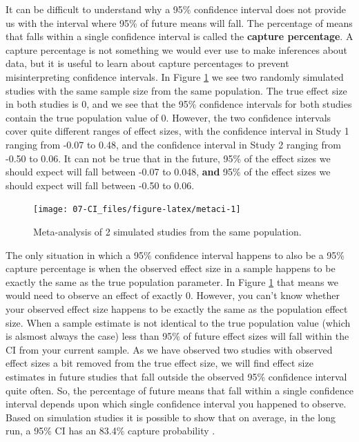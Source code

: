 \documentclass[
  oneside]{book}
\begin{document}
It can be difficult to understand why a 95\% confidence interval does not provide us with the interval where 95\% of future means will fall. The percentage of means that falls within a single confidence interval is called the \textbf{capture percentage}. A capture percentage is not something we would ever use to make inferences about data, but it is useful to learn about capture percentages to prevent misinterpreting confidence intervals. In Figure \ref{fig:metaci} we see two randomly simulated studies with the same sample size from the same population. The true effect size in both studies is 0, and we see that the 95\% confidence intervals for both studies contain the true population value of 0. However, the two confidence intervals cover quite different ranges of effect sizes, with the confidence interval in Study 1 ranging from -0.07 to 0.48, and the confidence interval in Study 2 ranging from -0.50 to 0.06. It can not be true that in the future, 95\% of the effect sizes we should expect will fall between -0.07 to 0.048, \textbf{and} 95\% of the effect sizes we should expect will fall between -0.50 to 0.06.



\begin{figure}

{\centering \texttt{[image: 07-CI\_files/figure-latex/metaci-1]} 

}

\caption{Meta-analysis of 2 simulated studies from the same population.}\label{fig:metaci}
\end{figure}

The only situation in which a 95\% confidence interval happens to also be a 95\% capture percentage is when the observed effect size in a sample happens to be exactly the same as the true population parameter. In Figure \ref{fig:metaci} that means we would need to observe an effect of exactly 0. However, you can't know whether your observed effect size happens to be exactly the same as the population effect size. When a sample estimate is not identical to the true population value (which is alsmost always the case) less than 95\% of future effect sizes will fall within the CI from your current sample. As we have observed two studies with observed effect sizes a bit removed from the true effect size, we will find effect size estimates in future studies that fall outside the observed 95\% confidence interval quite often. So, the percentage of future means that fall within a single confidence interval depends upon which single confidence interval you happened to observe. Based on simulation studies it is possible to show that on average, in the long run, a 95\% CI has an 83.4\% capture probability \citep{cumming_confidence_2006}.
\end{document}
